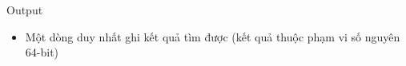 Output
\begin{itemize}
	\item     Một dòng duy nhất ghi kết quả tìm được (kết quả thuộc phạm vi số nguyên 64-bit)   
\end{itemize}